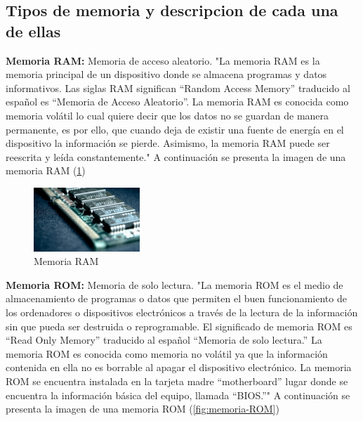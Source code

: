 \documentclass{article}
\begin{document}
\subsection{Tipos de memoria y descripcion de cada una de ellas}
\textbf{Memoria RAM:}
Memoria de acceso aleatorio.
\newline
\newline
"La memoria RAM es la memoria principal de un dispositivo donde se almacena programas y datos informativos. Las siglas RAM significan “Random Access Memory” traducido al español es “Memoria de Acceso Aleatorio”.
La memoria RAM es conocida como memoria volátil lo cual quiere decir que los datos no se guardan de manera permanente, es por ello, que cuando deja de existir una fuente de energía en el dispositivo la información se pierde. Asimismo, la memoria RAM puede ser reescrita y leída constantemente."\cite{RAM} 
\newline
\newline
A continuación se presenta la imagen de una memoria RAM (\ref{fig:memoria-RAM})
\begin{figure}[h]
\includegraphics[width=4cm]{memoria-RAM.jpg}\centering
\caption{Memoria RAM}
\label{fig:memoria-RAM}
\end{figure}
\newline
\textbf{Memoria ROM:} Memoria de solo lectura.
\newline
\newline
"La memoria ROM es el medio de almacenamiento de programas o datos que permiten el buen funcionamiento de los ordenadores o dispositivos electrónicos a través de la lectura de la información sin que pueda ser destruida o reprogramable. El significado de memoria ROM es “Read Only Memory” traducido al español “Memoria de solo lectura.”
\newline
La memoria ROM es conocida como memoria no volátil ya que la información contenida en ella no es borrable al apagar el dispositivo electrónico.
\newline
La memoria ROM se encuentra instalada en la tarjeta madre “motherboard” lugar donde se encuentra la información básica del equipo, llamada “BIOS.”"\cite{ROM}
\newline
\newline
A continuación se presenta la imagen de una memoria ROM (\ref{fig:memoria-ROM})
\end{document}
